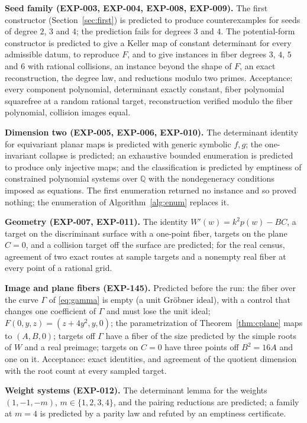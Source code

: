 \documentclass[11pt]{article}
\theoremstyle{definition}
\theoremstyle{remark}
\newcommand{\Q}{\mathbb{Q}}
\begin{document}
\textbf{Seed family (EXP-003, EXP-004, EXP-008, EXP-009).} The first constructor (Section~\ref{sec:first}) is predicted to produce counterexamples for seeds of degree $2$, $3$ and $4$; the prediction fails for degrees $3$ and $4$. The potential-form constructor is predicted to give a Keller map of constant determinant for every admissible datum, to reproduce $F$, and to give instances in fiber degrees $3$, $4$, $5$ and $6$ with rational collisions, an instance beyond the shape of $F$, an exact reconstruction, the degree law, and reductions modulo two primes. Acceptance: every component polynomial, determinant exactly constant, fiber polynomial squarefree at a random rational target, reconstruction verified modulo the fiber polynomial, collision images equal.

\textbf{Dimension two (EXP-005, EXP-006, EXP-010).} The determinant identity for equivariant planar maps is predicted with generic symbolic $f, g$; the one-invariant collapse is predicted; an exhaustive bounded enumeration is predicted to produce only injective maps; and the classification is predicted by emptiness of constrained polynomial systems over $\Q$ with the nondegeneracy conditions imposed as equations. The first enumeration returned no instance and so proved nothing; the enumeration of Algorithm~\ref{alg:enum} replaces it.

\textbf{Geometry (EXP-007, EXP-011).} The identity $W'(w) = k^2p(w) - BC$, a target on the discriminant surface with a one-point fiber, targets on the plane $C = 0$, and a collision target off the surface are predicted; for the real census, agreement of two exact routes at sample targets and a nonempty real fiber at every point of a rational grid.

\textbf{Image and plane fibers (EXP-145).} Predicted before the run: the fiber over the curve $\Gamma$ of \eqref{eq:gamma} is empty (a unit Gr\"obner ideal), with a control that changes one coefficient of $\Gamma$ and must lose the unit ideal; $F(0,y,z) = (z + 4y^2, y, 0)$; the parametrization of Theorem~\ref{thm:cplane} maps to $(A,B,0)$; targets off $\Gamma$ have a fiber of the size predicted by the simple roots of $W$ and a real preimage; targets on $C = 0$ have three points off $B^2 = 16A$ and one on it. Acceptance: exact identities, and agreement of the quotient dimension with the root count at every sampled target.

\textbf{Weight systems (EXP-012).} The determinant lemma for the weights $(1,-1,-m)$, $m \in \{1,2,3,4\}$, and the pairing reductions are predicted; a family at $m = 4$ is predicted by a parity law and refuted by an emptiness certificate.
\end{document}
